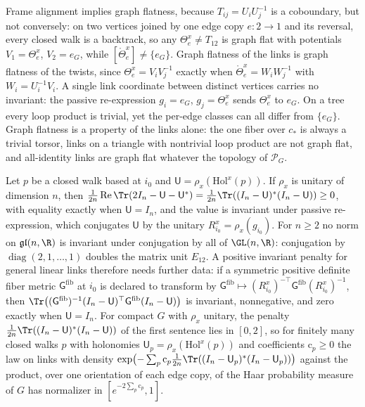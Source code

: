 Frame alignment implies graph flatness, because $T_{ij}=U_iU_j^{-1}$ is a coboundary, but not
conversely: on two vertices joined by one edge copy $e:2\to1$ and its reversal, every closed walk is
a backtrack, so any $\Theta_e^x\neq T_{12}$ is graph flat with potentials $V_1=\Theta_e^x$,
$V_2=e_G$, while $[\mathring\Theta_e^x]\neq\{e_G\}$. Graph flatness of the links is graph flatness
of the twists, since $\Theta_e^x=V_iV_j^{-1}$ exactly when $\mathring\Theta_e^x=W_iW_j^{-1}$ with
$W_i=U_i^{-1}V_i$. A single link coordinate between distinct vertices carries no invariant: the passive re-expression
$g_i=e_G$, $g_j=\Theta_e^x$ sends $\Theta_e^x$ to $e_G$. On a tree every loop product is trivial,
yet the per-edge classes can all differ from $\{e_G\}$. Graph flatness is a property of the links
alone: the one fiber over $c_*$ is always a trivial torsor, links on a triangle with nontrivial loop
product are not graph flat, and all-identity links are graph flat whatever the topology of
$\mathscr P_G$. 

Let $p$ be a closed walk based at $i_0$ and $\mathsf U=\rho_x(\mathrm{Hol}^x(p))$. If $\rho_x$ is unitary
of dimension $n$, then
$\frac{1}{2n}\operatorname{Re}\Tr(2I_n-\mathsf U-\mathsf U^*)=\frac{1}{2n}\Tr((I_n-\mathsf U)^*(I_n-\mathsf U))\geq0$,
with equality exactly when $\mathsf U=I_n$, and the value is invariant under passive re-expression,
which conjugates $\mathsf U$ by the unitary $R_{i_0}^x=\rho_x(g_{i_0})$. For $n\geq2$ no norm on
$\mathfrak{gl}(n,\R)$ is invariant under conjugation by all of $\GL(n,\R)$: conjugation by
$\operatorname{diag}(2,1,\ldots,1)$ doubles the matrix unit $E_{12}$. A positive invariant penalty for
general linear links therefore needs further data: if a symmetric positive definite fiber metric
$\mathsf G^{\mathrm{fib}}$ at $i_0$ is declared to transform by
$\mathsf G^{\mathrm{fib}}\mapsto(R_{i_0}^x)^{-\top}\mathsf G^{\mathrm{fib}}(R_{i_0}^x)^{-1}$, then
$\Tr\bigl((\mathsf G^{\mathrm{fib}})^{-1}(I_n-\mathsf U)^\top\mathsf G^{\mathrm{fib}}(I_n-\mathsf U)\bigr)$
is invariant, nonnegative, and zero exactly when $\mathsf U=I_n$. For compact $G$ with $\rho_x$
unitary, the penalty $\frac{1}{2n}\Tr((I_n-\mathsf U)^*(I_n-\mathsf U))$ of the first sentence lies
in $[0,2]$, so for finitely many closed walks $p$ with holonomies
$\mathsf U_p=\rho_x(\mathrm{Hol}^x(p))$ and coefficients $\mathrm c_p\geq0$ the law on links with
density $\exp\bigl(-\sum_p\mathrm c_p\frac{1}{2n}\Tr((I_n-\mathsf U_p)^*(I_n-\mathsf U_p))\bigr)$
against the product, over one orientation of each edge copy, of the Haar probability measure of $G$
has normalizer in $[e^{-2\sum_p\mathrm c_p},1]$. 

